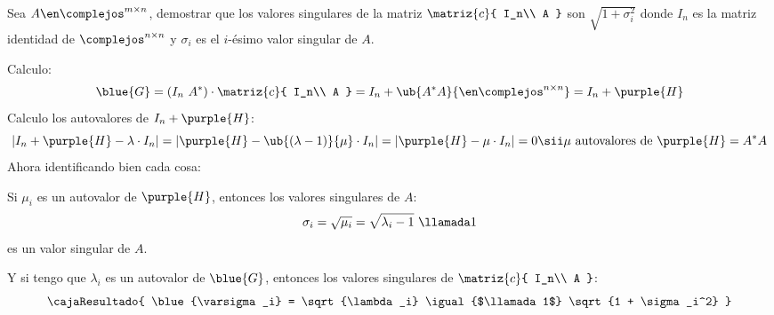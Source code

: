 \begin{enunciado}{\ejercicio}
  Sea $A \en \complejos^{m \times n}$, demostrar que los valores singulares de la matriz
  $\matriz{c}{
      I_n\\
      A
    }$
  son $\sqrt{1 + \sigma_i^2}$ donde $I_n$ es la matriz identidad de $\complejos^{n \times n}$ y $\sigma_i$ es
  el $i$-ésimo valor singular de $A$.
\end{enunciado}
Calculo:
$$
  \blue{G} =
  (I_n\ A^*) \cdot
  \matriz{c}{
    I_n\\
    A
  }
  =
  I_n + \ub{A^* A}{\en \complejos^{n \times n}} = I_n  + \purple{H}
$$
Calculo los autovalores de $I_n + \purple{H}$:
$$
  |I_n + \purple{H} - \lambda \cdot I_n| =
  |\purple{H} - \ub{(\lambda - 1)}{\mu}\cdot I_n| =
  |\purple{H} - \mu \cdot I_n|  = 0
  \sii
  \mu \text{ autovalores de } \purple{H} = A^*A
$$
Ahora identificando bien cada cosa:

Si $\mu_i$ es un autovalor de $\purple{H}$, entonces los valores singulares de $A$:
$$
  \sigma_i = \sqrt{\mu_i} = \sqrt{\lambda_i - 1}\ \llamada1
$$
es un valor singular de $A$.

Y si tengo que $\lambda_i$ es un autovalor de $\blue{G}$, entonces los valores singulares de
$
  \matriz{c}{
    I_n\\
    A
  }
$:
$$
  \cajaResultado{
    \blue{\varsigma_i} = \sqrt{\lambda_i} \igual{$\llamada1$} \sqrt{1 + \sigma_i^2}
  }
$$

\begin{aportes}
  \item {}
\end{aportes}
